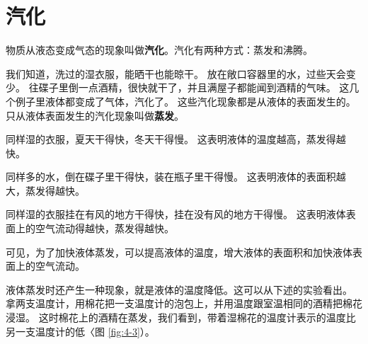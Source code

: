 \section{汽化}\label{sec:4-3}

物质从液态变成气态的现象叫做\textbf{汽化}。汽化有两种方式：蒸发和沸腾。

我们知道，洗过的湿衣服，能晒干也能晾干。
放在敞口容器里的水，过些天会变少。
往碟子里倒一点酒精，很快就干了，并且满屋子都能闻到酒精的气味。
这几个例子里液体都变成了气体，汽化了。
这些汽化现象都是从液体的表面发生的。
只从液体表面发生的汽化现象叫做\textbf{蒸发}。

同样湿的衣服，夏天干得快，冬天干得慢。
这表明液体的温度越高，蒸发得越快。

同样多的水，倒在碟子里干得快，装在瓶子里干得慢。
这表明液体的表面积越大，蒸发得越快。

同样湿的衣服挂在有风的地方干得快，挂在没有风的地方干得慢。
这表明液体表面上的空气流动得越快，蒸发得越快。

可见，为了加快液体蒸发，可以提高液体的温度，增大液体的表面积和加快液体表面上的空气流动。

液体蒸发时还产生一种现象，就是液体的温度降低。这可以从下述的实验看出。
拿两支温度计，用棉花把一支温度计的泡包上，并用温度跟室温相同的酒精把棉花浸湿。
这时棉花上的酒精在蒸发，我们看到，带着湿棉花的温度计表示的温度比另一支温度计的低〈图 \ref{fig:4-3}）。

